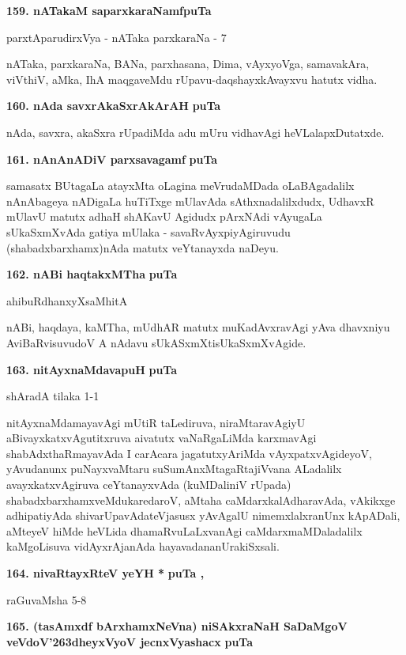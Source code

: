 \medskip
\noindent
\textbf{159. nATakaM saparxkaraNamf}\hfill{\bf puTa \pageref{217}}

\hfill{parxtAparudirxVya - nATaka parxkaraNa - 7}

\smallskip
nATaka, parxkaraNa, BANa, parxhasana, Dima, vAyxyoVga, samavakAra, viVthiV, aMka, IhA maqga\-veMdu \-rUpavu-daqshayxkAvayxvu hatutx vidha.

\medskip
\noindent
\textbf{160. nAda savxrAkaSxrAkArAH} \hfill{\bf puTa \pageref{149}}

\smallskip
nAda, savxra, akaSxra rUpadiMda adu mUru vidhavAgi heVLalapxDutatxde.


\medskip
\noindent
\textbf{161. nAnAnADiV parxsavagamf} \hfill{\bf puTa \pageref{155}}

\smallskip
samasatx BUtagaLa atayxMta oLagina meVrudaMDada oLaBAgadalilx nAnAbageya nADigaLa huTiTxge mUla\-vAda sAthxnadalilxdudx, UdhavxR mUlavU matutx adhaH shAKavU Agidudx pArxNAdi vAyugaLa sUkaSxmXvAda gatiya mUlaka - savaRvAyxpiyAgiruvudu (shabadxbarxhamx)nAda matutx veYtanayxda naDeyu.

\eject

\noindent
\textbf{162. nABi haqtakxMTha} \hfill{\bf puTa \pageref{151}}

\hfill{ahibuRdhanxyXsaMhitA}

\smallskip
nABi, haqdaya, kaMTha, mUdhAR matutx muKadAvxravAgi yAva dhavxniyu AviBaRvisuvudoV A nAdavu sUkASxmXtisUkaSxmXvAgide. 

\medskip
\noindent
\textbf{163. nitAyxnaMdavapuH} \hfill{\bf puTa \pageref{165}}

\hfill{shAradA tilaka 1-1}

\smallskip
nitAyxnaMdamayavAgi mUtiR taLediruva, niraMtaravAgiyU aBivayxkatx\-vAgu\-titxruva aivatutx vaNaR\-gaLiMda karxmavAgi shabAdxthaRmayavAda I carAcara jagatutx\break yAriMda vAyxpatxvAgideyoV, yAvu\-danunx puNayxvaMtaru suSumAnxMtagaRta\break \hbox{jiVvana} ALadalilx avayxkatxvAgiruva ceYtanayxvAda (kuMDaliniV rUpada) shabadxbarxhamxveMdu\break karedaroV, aMtaha caMdarxkalAdharavAda, vAkikxge adhipatiyAda shivarUpavAda\break teVjasusx yAvAgalU nimemxlalxranUnx kApADali, aMteyeV hiMde heVLida dhamaR\-vuLaLxvanAgi caMdarxmaMDaladalilx kaMgoLisuva vidAyxrAjanAda hayavadananU\break rakiSxsali.

\medskip
\noindent
\textbf{164. nivaRtayxRteV yeYH *} \hfill{\bf puTa \pageref{56}, \pageref{57}}

\hfill{raGuvaMsha 5-8}

\medskip
\noindent
\textbf{165. (tasAmxdf bArxhamxNeVna) niSAkxraNaH SaDaMgoV veVdoV\char'263dheyxVyoV jecnxVyashacx} \hfill{\bf puTa \pageref{42}}

